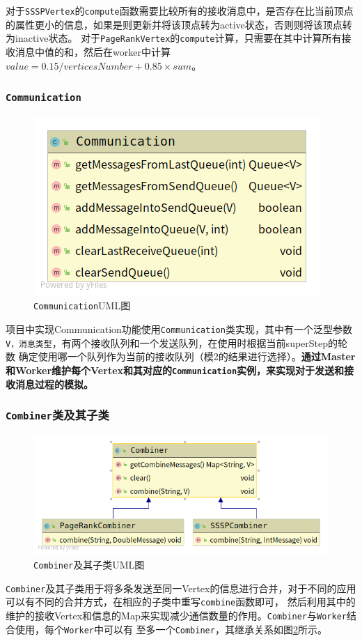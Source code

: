 \documentclass{ML}
\begin{document}
对于\texttt{SSSPVertex}的\texttt{compute}函数需要比较所有的接收消息中，是否存在比当前顶点的属性更小的信息，如果是则更新并将该顶点转为active状态，否则则将该顶点转为inactive状态。
对于\texttt{PageRankVertex}的\texttt{compute}计算，只需要在其中计算所有接收消息中值的和，然后在worker中计算$value = 0.15 / verticesNumber + 0.85 \times sum$\cite{pregel}。


\subsubsection{\texttt{Communication}}\label{sec:communication}
\begin{figure}[htb]
    \centering
    \includegraphics[width=0.5\linewidth]{media/Communication.png}
    \caption{\texttt{Communication}UML图}\label{fig:Communication}
\end{figure}

项目中实现Communication功能使用\texttt{Communication}类实现，其中有一个泛型参数\texttt{V，消息类型}，有两个接收队列和一个发送队列，在使用时根据当前superStep的轮数
确定使用哪一个队列作为当前的接收队列（模2的结果进行选择）。\textbf{通过Master和Worker维护每个Vertex和其对应的\texttt{Communication}实例，来实现对于发送和接收消息过程的模拟。}


\subsubsection{\texttt{Combiner}类及其子类}
\begin{figure}[htb]
    \centering
    \includegraphics[width=0.7\linewidth]{media/combiner.png}
    \caption{\texttt{Combiner}及其子类UML图}\label{fig:combiner}
\end{figure}
\texttt{Combiner}及其子类用于将多条发送至同一Vertex的信息进行合并，对于不同的应用可以有不同的合并方式，在相应的子类中重写\texttt{combine}函数即可，
然后利用其中的维护的接收Vertex和信息的Map来实现减少通信数量的作用。\texttt{Combiner}与\texttt{Worker}结合使用，每个\texttt{Worker}中可以有
至多一个\texttt{Combiner}，其继承关系如图\ref{fig:combiner}所示。
\end{document}
